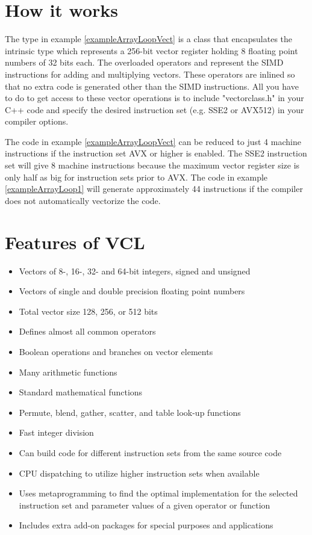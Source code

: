 \documentclass[vcl_manual.tex]{subfiles}
\begin{document}
\section{How it works} \label{HowItWorks}
The type  in example \ref{exampleArrayLoopVect} is a class that encapsulates the intrinsic type 
 which represents a 256-bit vector register holding 8 floating point numbers of 32 bits each. The overloaded operators \codei{+} and \codei{*} represent the SIMD instructions for adding and multiplying vectors. These operators are inlined so that no extra code is generated other than the SIMD instructions. All you have to do to get access to these vector operations is to include "vectorclass.h" in your C++ code and specify the desired instruction set (e.g. SSE2 or AVX512) in your compiler options.

The code in example \ref{exampleArrayLoopVect} can be reduced to just 4 machine instructions if the instruction set AVX or higher is enabled. The SSE2 instruction set will give 8 machine instructions because the maximum vector register size is only half as big for instruction sets prior to AVX. The code in example \ref{exampleArrayLoop1} will generate approximately 44 instructions if the compiler does not automatically vectorize the code.

\section{Features of VCL} \label{Features}

\begin{itemize}
\item Vectors of 8-, 16-, 32- and 64-bit integers, signed and unsigned
\item Vectors of single and double precision floating point numbers
\item Total vector size 128, 256, or 512 bits
\item Defines almost all common operators
\item Boolean operations and branches on vector elements
\item Many arithmetic functions
\item Standard mathematical functions
\item Permute, blend, gather, scatter, and table look-up functions
\item Fast integer division
\item Can build code for different instruction sets from the same source code
\item CPU dispatching to utilize higher instruction sets when available
\item Uses metaprogramming to find the optimal implementation for the selected instruction set and parameter values of a given operator or function
\item Includes extra add-on packages for special purposes and applications
\end{itemize}
\end{document}

